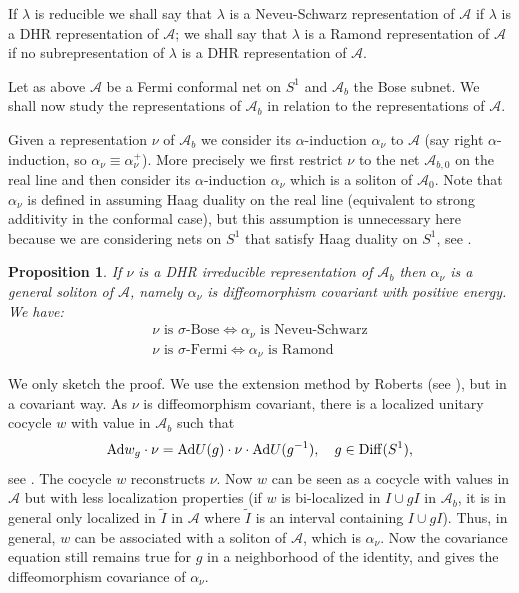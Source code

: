 \documentclass[11pt]{article}
\def\proof{\trivlist \item[\hskip \labelsep{\bf Proof.\ }]}
\def\Ad{{\hbox{\rm Ad}}}
\def\a{\alpha}
\def\l{\lambda}
\newtheorem{proposition}[theorem]{Proposition}
\def\A{{\cal A}}
\def\s{{\sigma}}
\def\Diff{{\rm Diff}}
\def\Diff{{\mathrm {Diff}}}
\def\A{{\mathcal A}}
\begin{document}
If $\l$ is reducible we shall say that $\l$ is a Neveu-Schwarz representation of $\A$ if $\l$ is a DHR representation of $\A$; we shall say that $\l$ is a Ramond representation of $\A$ if no subrepresentation of $\l$ is a DHR representation of $\A$.

Let as above $\A$ be a Fermi conformal net on $S^1$ and $\A_b$ the Bose subnet. We shall now study the representations of $\A_b$ in relation to the representations of $\A$.

Given a representation $\nu$ of $\A_b$ we consider its $\a$-induction $\a_\nu$ to $\A$ (say right $\a$-induction, so $\a_\nu\equiv\a^+_\nu$). More precisely we first restrict $\nu$ to the net $\A_{b,0}$ on the real line and then consider its $\a$-induction $\a_\nu$ which is a soliton of $\A_0$. Note that $\a_\nu$ is defined in \cite{LR1} assuming Haag duality on the real line (equivalent to strong additivity in the conformal case), but this assumption is unnecessary here because we are considering nets on $S^1$ that satisfy Haag duality on $S^1$, see \cite[Sect. 3.1]{LX}.
%
\begin{proposition}\label{acov}
If $\nu$ is a DHR irreducible representation of $\A_b$ then $\a_\nu$ is a general soliton of $\A$, namely $\a_\nu$ is diffeomorphism covariant with positive energy. We have:
\begin{gather*}
\text{$\nu$ is $\s$-Bose} \Leftrightarrow \text{$\a_\nu$ is Neveu-Schwarz}\\
\text{$\nu$ is $\s$-Fermi} \Leftrightarrow \text{$\a_\nu$ is Ramond}
\end{gather*}
\end{proposition}
\proof
We only sketch the proof.
We use the extension method by Roberts (see \cite{Ro}), but in a covariant way.
As $\nu$ is diffeomorphism covariant, there is a localized unitary cocycle $w$ with value in $\A_b$ such that
\begin{equation}\label{ce}
 \Ad w_g\cdot \nu = \Ad U(g)\cdot \nu\cdot\Ad U(g^{-1}),\quad g\in\Diff(S^1),
\end{equation}
see \cite[Sect. 8]{GL1}. The cocycle $w$ reconstructs $\nu$. Now $w$ can be seen as a cocycle with values in $\A$ but with less localization properties (if $w$ is bi-localized in $I\cup gI$ in $\A_b$, it is in general only localized in $\tilde I$ in $\A$ where $\tilde I$ is an interval containing $I\cup gI$). Thus, in general,  $w$ can be associated with a soliton of $\A$, which is $\a_\nu$. Now the covariance equation still remains true for $g$ in a neighborhood of the identity, and gives the diffeomorphism covariance of $\a_\nu$.
\end{document}
